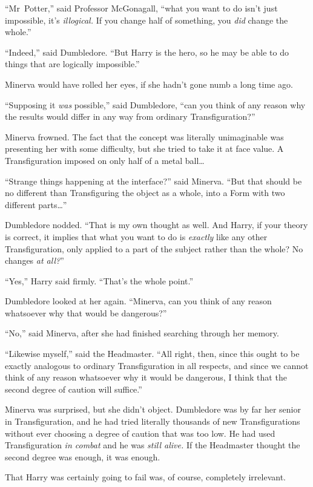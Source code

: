 “Mr~Potter,” said Professor McGonagall, “what you want to do isn’t just impossible, it’s \emph{illogical.} If you change half of something, you \emph{did} change the whole.”

“Indeed,” said Dumbledore. “But Harry is the hero, so he may be able to do things that are logically impossible.”

Minerva would have rolled her eyes, if she hadn’t gone numb a long time ago.

“Supposing it \emph{was} possible,” said Dumbledore, “can you think of any reason why the results would differ in any way from ordinary Transfiguration?”

Minerva frowned. The fact that the concept was literally unimaginable was presenting her with some difficulty, but she tried to take it at face value. A Transfiguration imposed on only half of a metal ball…

“Strange things happening at the interface?” said Minerva. “But that should be no different than Transfiguring the object as a whole, into a Form with two different parts…”

Dumbledore nodded. “That is my own thought as well. And Harry, if your theory is correct, it implies that what you want to do is \emph{exactly} like any other Transfiguration, only applied to a part of the subject rather than the whole? No changes \emph{at all?}”

“Yes,” Harry said firmly. “That’s the whole point.”

Dumbledore looked at her again. “Minerva, can you think of any reason whatsoever why that would be dangerous?”

“No,” said Minerva, after she had finished searching through her memory.

“Likewise myself,” said the Headmaster. “All right, then, since this ought to be exactly analogous to ordinary Transfiguration in all respects, and since we cannot think of any reason whatsoever why it would be dangerous, I think that the second degree of caution will suffice.”

Minerva was surprised, but she didn’t object. Dumbledore was by far her senior in Transfiguration, and he had tried literally thousands of new Transfigurations without ever choosing a degree of caution that was too low. He had used Transfiguration \emph{in combat} and he was \emph{still alive.} If the Headmaster thought the second degree was enough, it was enough.

That Harry was certainly going to fail was, of course, completely irrelevant.

